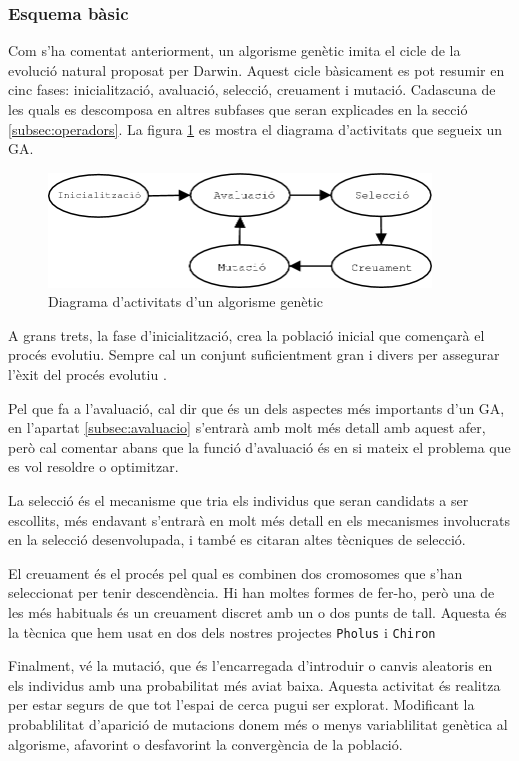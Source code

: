 \subsubsection{Esquema bàsic}

Com s'ha comentat anteriorment, un algorisme genètic imita el cicle de la evolució natural
proposat per Darwin. Aquest cicle bàsicament es pot resumir en cinc fases:
inicialització, avaluació, selecció, creuament i mutació. Cadascuna de les quals
es descomposa en altres subfases que seran explicades en la secció
\ref{subsec:operadors}. La figura \ref{fig:ga} es mostra el diagrama
d'activitats que segueix un GA.

\begin{figure} \centering \includegraphics[width=4in]{intro/ga}
\caption{\label{fig:ga}Diagrama d'activitats d'un algorisme genètic}
\end{figure}

A grans trets, la fase d'inicialització, crea la població inicial que començarà
el procés evolutiu. Sempre cal un conjunt suficientment gran i divers per
assegurar l'èxit del procés evolutiu \cite{G02}.

Pel que fa a l'avaluació, cal dir que és un dels aspectes més importants d'un
GA, en l'apartat \ref{subsec:avaluacio} s'entrarà amb molt més detall amb aquest
afer, però cal comentar abans que la funció d'avaluació és en si mateix el
problema que es vol resoldre o optimitzar.

La selecció és el mecanisme que tria els individus que seran candidats a ser
escollits, més endavant s'entrarà en molt més detall en els mecanismes
involucrats en la selecció desenvolupada, i també es citaran altes tècniques de
selecció.

El creuament és el procés pel qual es combinen dos cromosomes que s'han
seleccionat per tenir descendència. Hi han moltes formes de fer-ho, però una de
les més habituals és un creuament discret amb un o dos punts de tall.  Aquesta
és la tècnica que hem usat en dos dels nostres projectes \texttt{Pholus} i
\texttt{Chiron}  %

Finalment, vé la mutació, que és l'encarregada d'introduir o canvis aleatoris en
els individus amb una probabilitat més aviat baixa. Aquesta activitat és
realitza per estar segurs de que tot l'espai de cerca pugui ser explorat.
Modificant la probablilitat d'aparició de mutacions donem més o menys
variablilitat genètica al algorisme, afavorint o desfavorint la convergència de
la població.


